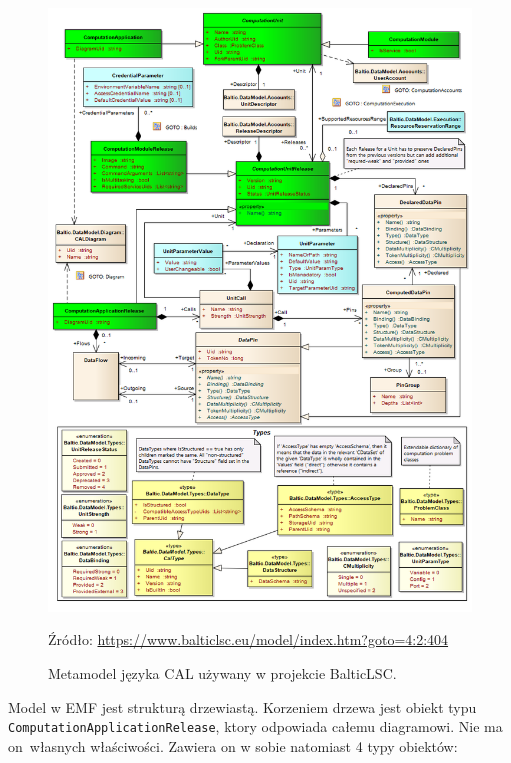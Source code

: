\begin{figure}[!hb]
	\centering


	\includegraphics[width=0.82\linewidth]{./images/cal-metamodel-balticlsc.png}
	\caption{Metamodel języka CAL używany w projekcie
		BalticLSC\@.}\label{rys:cal-metamodel-balticlsc}

	\medskip
	{\small Źródło:
		\url{https://www.balticlsc.eu/model/index.htm?goto=4:2:404}}
\end{figure}

Model w EMF jest strukturą drzewiastą. Korzeniem drzewa jest obiekt typu
\texttt{ComputationApplicationRelease}, ktory odpowiada całemu diagramowi. Nie
ma on~własnych właściwości. Zawiera on w sobie natomiast 4 typy obiektów:

